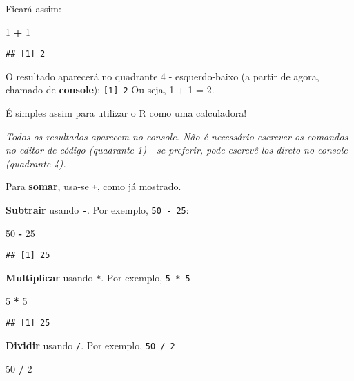 \documentclass[
]{article}
\newenvironment{Shaded}{\begin{snugshade}}{\end{snugshade}}
\newcommand{\DecValTok}[1]{\textcolor[rgb]{0.00,0.00,0.81}{#1}}
\newcommand{\OperatorTok}[1]{\textcolor[rgb]{0.81,0.36,0.00}{\textbf{#1}}}
\newcommand{\StringTok}[1]{\textcolor[rgb]{0.31,0.60,0.02}{#1}}
\begin{document}
Ficará assim:

\begin{Shaded}
\begin{Highlighting}[]
\DecValTok{1} \OperatorTok{+}\StringTok{ }\DecValTok{1}
\end{Highlighting}
\end{Shaded}

\begin{verbatim}
## [1] 2
\end{verbatim}

O resultado aparecerá no quadrante 4 - esquerdo-baixo (a partir de
agora, chamado de \textbf{console}): \texttt{{[}1{]}\ 2} Ou seja, 1 + 1
= 2.

É simples assim para utilizar o R como uma calculadora!

\emph{Todos os resultados aparecem no console. Não é necessário escrever
os comandos no editor de código (quadrante 1) - se preferir, pode
escrevê-los direto no console (quadrante 4).}

Para \textbf{somar}, usa-se \texttt{+}, como já mostrado.

\textbf{Subtrair} usando \texttt{-}. Por exemplo, \texttt{50\ -\ 25}:

\begin{Shaded}
\begin{Highlighting}[]
\DecValTok{50} \OperatorTok{-}\StringTok{ }\DecValTok{25}
\end{Highlighting}
\end{Shaded}

\begin{verbatim}
## [1] 25
\end{verbatim}

\textbf{Multiplicar} usando \texttt{*}. Por exemplo, \texttt{5\ *\ 5}

\begin{Shaded}
\begin{Highlighting}[]
\DecValTok{5} \OperatorTok{*}\StringTok{ }\DecValTok{5}
\end{Highlighting}
\end{Shaded}

\begin{verbatim}
## [1] 25
\end{verbatim}

\textbf{Dividir} usando \texttt{/}. Por exemplo, \texttt{50\ /\ 2}

\begin{Shaded}
\begin{Highlighting}[]
\DecValTok{50} \OperatorTok{/}\StringTok{ }\DecValTok{2}
\end{Highlighting}
\end{Shaded}
\end{document}
